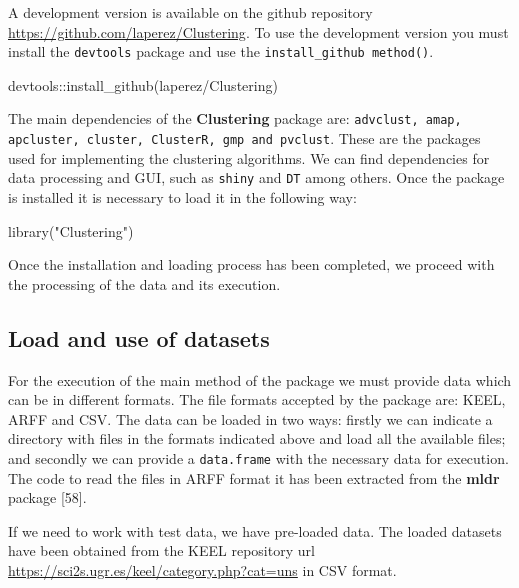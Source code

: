 \documentclass[
]{article}
\newenvironment{Shaded}{\begin{snugshade}}{\end{snugshade}}
\newcommand{\FunctionTok}[1]{\textcolor[rgb]{0.00,0.00,0.00}{#1}}
\newcommand{\NormalTok}[1]{#1}
\newcommand{\SpecialCharTok}[1]{\textcolor[rgb]{0.00,0.00,0.00}{#1}}
\newcommand{\StringTok}[1]{\textcolor[rgb]{0.31,0.60,0.02}{#1}}
\begin{document}
A development version is available on the github repository
\url{https://github.com/laperez/Clustering}. To use the development
version you must install the \texttt{devtools} package and use the
\texttt{install\_github method()}.

\begin{Shaded}
\begin{Highlighting}[]
\NormalTok{devtools}\SpecialCharTok{::}\FunctionTok{install\_github}\NormalTok{(}\StringTok{\textquotesingle{}laperez/Clustering\textquotesingle{}}\NormalTok{)}
\end{Highlighting}
\end{Shaded}

The main dependencies of the \textbf{Clustering} package are:
\texttt{advclust, amap, apcluster, cluster, ClusterR, gmp and pvclust}.
These are the packages used for implementing the clustering algorithms.
We can find dependencies for data processing and GUI, such as
\texttt{shiny} and \texttt{DT} among others. Once the package is
installed it is necessary to load it in the following way:

\begin{Shaded}
\begin{Highlighting}[]
\FunctionTok{library}\NormalTok{(}\StringTok{"Clustering"}\NormalTok{)}
\end{Highlighting}
\end{Shaded}

Once the installation and loading process has been completed, we proceed
with the processing of the data and its execution.

\hypertarget{load-and-use-of-datasets}{%
\subsection{Load and use of datasets}\label{load-and-use-of-datasets}}

For the execution of the main method of the package we must provide data
which can be in different formats. The file formats accepted by the
package are: KEEL, ARFF and CSV. The data can be loaded in two ways:
firstly we can indicate a directory with files in the formats indicated
above and load all the available files; and secondly we can provide a
\texttt{data.frame} with the necessary data for execution. The code to
read the files in ARFF format it has been extracted from the
\textbf{mldr} package {[}58{]}.

If we need to work with test data, we have pre-loaded data. The loaded
datasets have been obtained from the KEEL repository url
\url{https://sci2s.ugr.es/keel/category.php?cat=uns} in CSV format.
\end{document}
